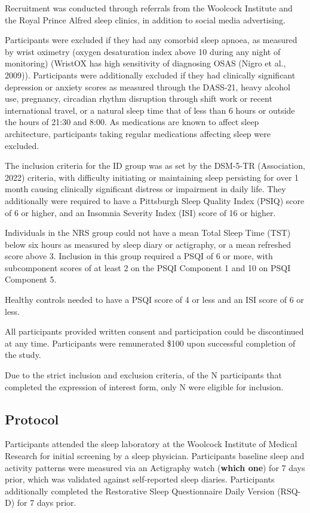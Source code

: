 \documentclass[
]{article}
\begin{document}
Recruitment was conducted through referrals from the Woolcock Institute
and the Royal Prince Alfred sleep clinics, in addition to social media
advertising.

Participants were excluded if they had any comorbid sleep apnoea, as
measured by wrist oximetry (oxygen desaturation index above 10 during
any night of monitoring) (WristOX has high sensitivity of diagnosing
OSAS (Nigro et al., 2009)). Participants were additionally excluded if
they had clinically significant depression or anxiety scores as measured
through the DASS-21, heavy alcohol use, pregnancy, circadian rhythm
disruption through shift work or recent international travel, or a
natural sleep time that of less than 6 hours or outside the hours of
21:30 and 8:00. As medications are known to affect sleep architecture,
participants taking regular medications affecting sleep were excluded.

The inclusion criteria for the ID group was as set by the DSM-5-TR
(Association, 2022) criteria, with difficulty initiating or maintaining
sleep persisting for over 1 month causing clinically significant
distress or impairment in daily life. They additionally were required to
have a Pittsburgh Sleep Quality Index (PSIQ) score of 6 or higher, and
an Insomnia Severity Index (ISI) score of 16 or higher.

Individuals in the NRS group could not have a mean Total Sleep Time
(TST) below six hours as measured by sleep diary or actigraphy, or a
mean refreshed score above 3. Inclusion in this group required a PSQI of
6 or more, with subcomponent scores of at least 2 on the PSQI Component
1 and 10 on PSQI Component 5.

Healthy controls needed to have a PSQI score of 4 or less and an ISI
score of 6 or less.

All participants provided written consent and participation could be
discontinued at any time. Participants were remunerated \$100 upon
successful completion of the study.

Due to the strict inclusion and exclusion criteria, of the N
participants that completed the expression of interest form, only N were
eligible for inclusion.

\subsection{Protocol}\label{protocol}

Participants attended the sleep laboratory at the Woolcock Institute of
Medical Research for initial screening by a sleep physician.
Participants baseline sleep and activity patterns were measured via an
Actigraphy watch (\textbf{which one}) for 7 days prior, which was
validated against self-reported sleep diaries. Participants additionally
completed the Restorative Sleep Questionnaire Daily Version (RSQ-D) for
7 days prior.
\end{document}
